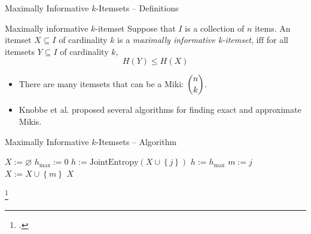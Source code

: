 \documentclass[12pt]{beamer}
\theoremstyle{break}
\newcommand*{\To}{\:\bm{ to }\:}
\begin{document}


\begin{frame}{Maximally Informative $k$-Itemsets -- Definitions}

	\begin{block}{Maximally informative $k$-itemset}
	    Suppose that $I$ is a collection of $n$ items. An itemset $X \subseteq I$ of cardinality $k$ is a \emph{maximally informative k-itemset}, $\mathrm{iff}$ for all itemsets $Y \subseteq I$ of cardinality $k$,
	    \begin{equation*}
	        H(Y) \leq H(X)
	    \end{equation*}
	\end{block}
	
	\pause
	
	\begin{itemize}
		\item There are many itemsets that can be a Miki: $\dbinom{n}{k}$.
		\item Knobbe et al. proposed several algorithms for finding exact and approximate Mikis.
	\end{itemize}

\end{frame}




\begin{frame}{Maximally Informative $k$-Itemsets -- Algorithm}

	\begin{center}
		\begin{algorithmic}[1]
	        \State $X:=\varnothing$
	        \For{$i:=1 \To k$}
	            \State $h_{\mathrm{max}}:=0$
	            \For{$j:=1 \To n$}
	                \State $h:=\textrm{JointEntropy}(X \cup \left\{j\right\})$
	                    \State $h:=h_{\mathrm{max}}$
	                    \State $m:=j$
	                    \State $X:=X \cup \left\{m\right\}$
	                \EndIf
	            \EndFor
	        \EndFor
	        \State \Return $X$
	    \EndFunction
		\end{algorithmic}
	\end{center}
	
	\footcitetext{Knobbe2006}
	
\end{frame}


\end{document}
